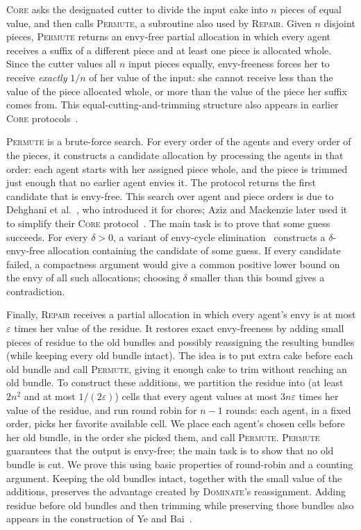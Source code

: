 \documentclass[11pt]{article}
\newcommand{\eps}{\varepsilon}
\newcommand{\Core}{\textsc{Core}}
\newcommand{\Repair}{\textsc{Repair}}
\newcommand{\Dominate}{\textsc{Dominate}}
\newcommand{\Permute}{\textsc{Permute}}
\theoremstyle{plain}
\theoremstyle{definition}
\theoremstyle{plain}
\begin{document}
\Core{} asks the designated cutter to divide the input cake into $n$ pieces of equal value, and then calls \Permute{}, a subroutine also used by \Repair{}. Given $n$ disjoint pieces, \Permute{} returns an envy-free partial allocation in which every agent receives a suffix of a different piece and at least one piece is allocated whole. Since the cutter values all $n$ input pieces equally, envy-freeness forces her to receive \emph{exactly} $1/n$ of her value of the input: she cannot receive less than the value of the piece allocated whole, or more than the value of the piece her suffix comes from. This equal-cutting-and-trimming structure also appears in earlier \Core{} protocols~\cite{aziz2016discretefour,aziz2016discrete,amanatidis2018improved}.


\Permute{} is a brute-force search. For every order of the agents and every order of the pieces, it constructs a candidate allocation by processing the agents in that order: each agent starts with her assigned piece whole, and the piece is trimmed just enough that no earlier agent envies it. The protocol returns the first candidate that is envy-free. This search over agent and piece orders is due to Dehghani et al.~\cite{dehghani2018envy}, who introduced it for chores; Aziz and Mackenzie later used it to simplify their \Core{} protocol~\cite{aziz2020bounded}. The main task is to prove that some guess succeeds. For every $\delta>0$, a variant of envy-cycle elimination~\cite{lipton2004approximately} constructs a $\delta$-envy-free allocation containing the candidate of some guess. If every candidate failed, a compactness argument would give a common positive lower bound on the envy of all such allocations; choosing $\delta$ smaller than this bound gives a contradiction.


Finally, \Repair{} receives a partial allocation in which every agent's envy is at most $\eps$ times her value of the residue. It restores exact envy-freeness by adding small pieces of residue to the old bundles and possibly reassigning the resulting bundles (while keeping every old bundle intact). The idea is to put extra cake before each old bundle and call \Permute{}, giving it enough cake to trim without reaching an old bundle. To construct these additions, we partition the residue into (at least $2n^2$ and at most $1/(2\eps)$) cells that every agent values at most $3n\eps$ times her value of the residue, and run round robin for $n-1$ rounds: each agent, in a fixed order, picks her favorite available cell. We place each agent's chosen cells before her old bundle, in the order she picked them, and call \Permute{}. \Permute{} guarantees that the output is envy-free; the main task is to show that no old bundle is cut. We prove this using basic properties of round-robin and a counting argument. Keeping the old bundles intact, together with the small value of the additions, preserves the advantage created by \Dominate{}'s reassignment. Adding residue before old bundles and then trimming while preserving those bundles also appears in the construction of Ye and Bai~\cite{ye2026cutting}.
\end{document}
